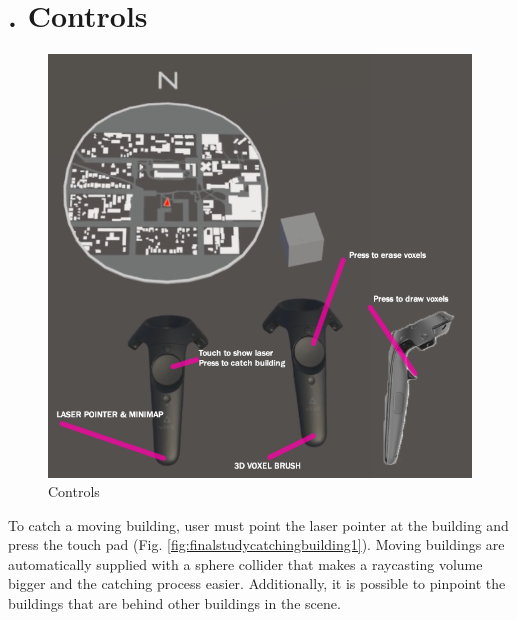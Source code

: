 \begin{appendices}
\begin{figure}
	\hfill
	\par\smallskip
	\hfill
\end{figure}

\chapter{. Controls}
\label{app:finalstudy_controls}
\begin{figure}[h]
	\centering
	\includegraphics[width=0.7\linewidth]{figures/placeholders/finalstudy_controllers} %
	\caption{Controls}
	\label{fig:finalstudycontrollers}
\end{figure}

To catch a moving building, user must point the laser pointer at the building and press the touch pad (Fig. \ref{fig:finalstudycatchingbuilding1}). Moving buildings are automatically supplied with a sphere collider that makes a raycasting volume bigger and the catching process easier. Additionally, it is possible to pinpoint the buildings that are behind other buildings in the scene.

\begin{figure}
	\centering
	

\end{figure}
\end{appendices}
